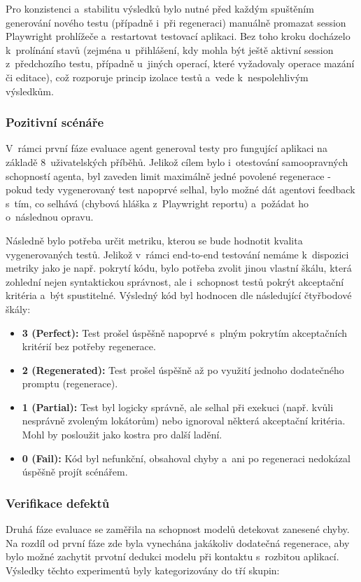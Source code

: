 \documentclass[czech, ing, kiv, he, iso690numb, viewonly]{fasthesis}
\begin{document}
Pro konzistenci a~stabilitu výsledků bylo nutné před každým spuštěním generování nového testu
(případně i~při regeneraci) manuálně promazat session Playwright prohlížeče a~restartovat 
testovací aplikaci. Bez toho kroku docházelo k~prolínání stavů (zejména u~přihlášení, 
kdy mohla být ještě aktivní session z~předchozího testu, případně u~jiných operací, které vyžadovaly 
operace mazání či editace), což rozporuje 
princip izolace testů a~vede k~nespolehlivým výsledkům. 

\subsubsection*{Pozitivní scénáře}
V~rámci první fáze evaluace agent generoval testy pro fungující aplikaci na základě 8~uživatelských příběhů.
Jelikož cílem bylo i~otestování samoopravných schopností agenta, 
byl zaveden limit maximálně jedné povolené regenerace - pokud tedy vygenerovaný test napoprvé selhal,
bylo možné dát agentovi feedback s~tím, co selhává (chybová hláška z~Playwright reportu) 
a~požádat ho o~následnou opravu.

Následně bylo potřeba určit metriku, kterou se bude hodnotit kvalita vygenerovaných testů.
Jelikož v~rámci end-to-end testování nemáme k~dispozici metriky jako je např. 
pokrytí kódu, bylo potřeba zvolit jinou vlastní škálu, která zohlední nejen syntaktickou správnost, 
ale i~schopnost testů pokrýt akceptační kritéria a~být spustitelné.
Výsledný kód byl hodnocen dle následující čtyřbodové škály:

\begin{itemize}
    \item \textbf{3 (Perfect):} Test prošel úspěšně napoprvé s~plným pokrytím akceptačních kritérií bez potřeby regenerace.
    \item \textbf{2 (Regenerated):} Test prošel úspěšně až po využití jednoho dodatečného promptu (regenerace).
    \item \textbf{1 (Partial):} Test byl logicky správně, ale selhal při exekuci (např. kvůli nesprávně zvoleným lokátorům) 
    nebo ignoroval některá akceptační kritéria. Mohl by posloužit jako kostra pro další ladění.
    \item \textbf{0 (Fail):} Kód byl nefunkční, obsahoval chyby a~ani po regeneraci nedokázal úspěšně projít scénářem.
\end{itemize}

\subsubsection*{Verifikace defektů}
Druhá fáze evaluace se zaměřila na schopnost modelů detekovat zanesené chyby.
Na rozdíl od první fáze zde byla vynechána jakákoliv dodatečná regenerace,
aby bylo možné zachytit prvotní dedukci modelu při kontaktu s~rozbitou aplikací.
Výsledky těchto experimentů byly kategorizovány do tří skupin: 
\end{document}
